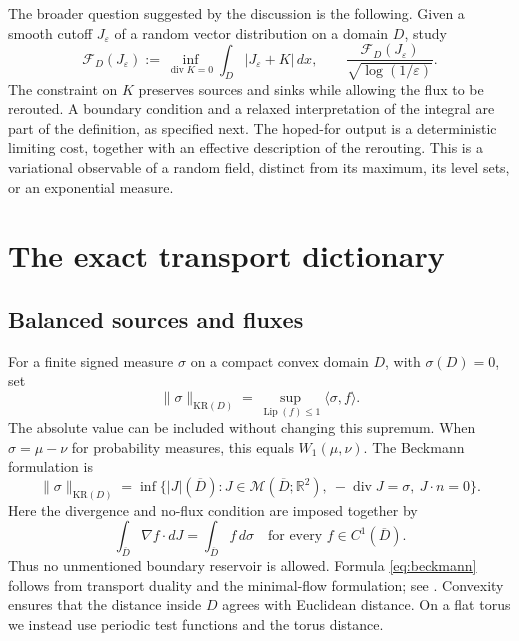 \documentclass[11pt]{article}
\theoremstyle{definition}
\newcommand{\R}{\mathbb R}
\newcommand{\Lip}{\operatorname{Lip}}
\newcommand{\diver}{\operatorname{div}}
\newcommand{\KR}{\mathrm{KR}}
\newcommand{\cF}{\mathcal F}
\newcommand{\cM}{\mathcal M}
\newcommand{\dd}{\,dx}
\begin{document}
The broader question suggested by the discussion is the following. Given
a smooth cutoff $J_\varepsilon$ of a random vector distribution on a domain
$D$, study
\begin{equation}\label{eq:informal}
  \cF_D(J_\varepsilon)
  :=\inf_{\diver K=0}\int_D|J_\varepsilon+K|\dd,
  \qquad
  \frac{\cF_D(J_\varepsilon)}{\sqrt{\log(1/\varepsilon)}}.
\end{equation}
The constraint on $K$ preserves sources and sinks while allowing the flux
to be rerouted. A boundary condition and a relaxed interpretation of the
integral are part of the definition, as specified next. The hoped-for
output is a deterministic limiting cost, together with an effective
description of the rerouting. This is a variational observable of a random
field, distinct from its maximum, its level sets, or an exponential measure.

\section{The exact transport dictionary}
\label{sec:dictionary}

\subsection{Balanced sources and fluxes}
For a finite signed measure $\sigma$ on a compact convex domain $D$, with
$\sigma(D)=0$, set
\[
  \|\sigma\|_{\KR(D)}
  =\sup_{\Lip(f)\leq1}\langle\sigma,f\rangle.
\]
The absolute value can be included without changing this supremum. When
$\sigma=\mu-\nu$ for probability measures, this equals $W_1(\mu,\nu)$.
The Beckmann formulation is
\begin{equation}\label{eq:beckmann}
  \|\sigma\|_{\KR(D)}
  =\inf\bigl\{|J|(\overline D):
       J\in\cM(\overline D;\R^2),\ -\diver J=\sigma,
       \ J\cdot n=0\bigr\}.
\end{equation}
Here the divergence and no-flux condition are imposed together by
\begin{equation}\label{eq:weakboundary}
  \int_{\overline D}\nabla f\cdot dJ=\int_{\overline D}f\,d\sigma
  \quad\text{for every }f\in C^1(\overline D).
\end{equation}
Thus no unmentioned boundary reservoir is allowed. Formula
\eqref{eq:beckmann} follows from transport duality and the minimal-flow
formulation; see \cite[Sections 3.1 and 4.2]{Santambrogio}. Convexity ensures
that the distance inside $D$ agrees with Euclidean distance. On a flat
torus we instead use periodic test functions and the torus distance.
\end{document}
